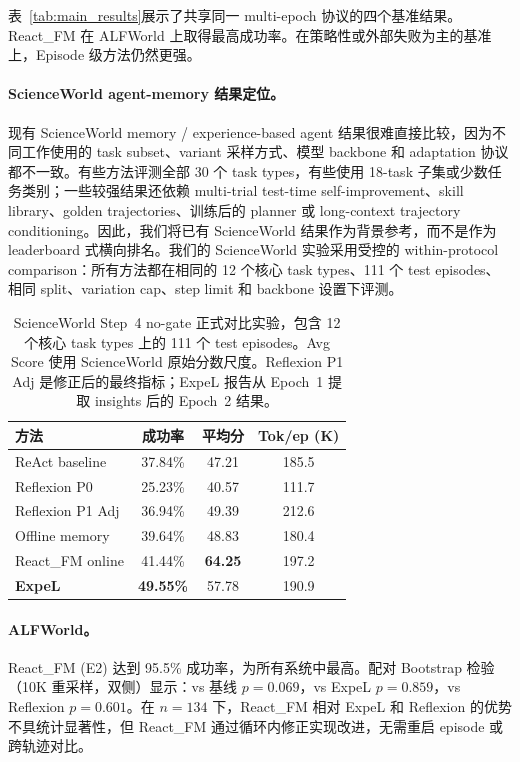 \documentclass[11pt,a4paper]{article}
\newcommand{\method}{React\_FM}
\begin{document}
表~\ref{tab:main_results}展示了共享同一 multi-epoch 协议的四个基准结果。\method{} 在 ALFWorld 上取得最高成功率。在策略性或外部失败为主的基准上，Episode 级方法仍然更强。

\paragraph{ScienceWorld agent-memory 结果定位。}
现有 ScienceWorld memory / experience-based agent 结果很难直接比较，因为不同工作使用的 task subset、variant 采样方式、模型 backbone 和 adaptation 协议都不一致。有些方法评测全部 30 个 task types，有些使用 18-task 子集或少数任务类别；一些较强结果还依赖 multi-trial test-time self-improvement、skill library、golden trajectories、训练后的 planner 或 long-context trajectory conditioning。因此，我们将已有 ScienceWorld 结果作为背景参考，而不是作为 leaderboard 式横向排名。我们的 ScienceWorld 实验采用受控的 within-protocol comparison：所有方法都在相同的 12 个核心 task types、111 个 test episodes、相同 split、variation cap、step limit 和 backbone 设置下评测。

\begin{table}[t]
\centering
\caption{ScienceWorld Step~4 no-gate 正式对比实验，包含 12 个核心 task types 上的 111 个 test episodes。Avg Score 使用 ScienceWorld 原始分数尺度。Reflexion P1 Adj 是修正后的最终指标；ExpeL 报告从 Epoch~1 提取 insights 后的 Epoch~2 结果。}
\label{tab:sw_step4}
\small
\setlength{\tabcolsep}{4pt}
\begin{tabular}{lccc}
\toprule
方法 & 成功率 & 平均分 & Tok/ep (K) \\
\midrule
ReAct baseline & 37.84\% & 47.21 & 185.5 \\
Reflexion P0 & 25.23\% & 40.57 & 111.7 \\
Reflexion P1 Adj & 36.94\% & 49.39 & 212.6 \\
Offline memory & 39.64\% & 48.83 & 180.4 \\
\method{} online & 41.44\% & \textbf{64.25} & 197.2 \\
\textbf{ExpeL} & \textbf{49.55\%} & 57.78 & 190.9 \\
\bottomrule
\end{tabular}
\end{table}

\paragraph{ALFWorld。} \method{} (E2) 达到 95.5\% 成功率，为所有系统中最高。配对 Bootstrap 检验（10K 重采样，双侧）显示：vs 基线 $p{=}0.069$，vs ExpeL $p{=}0.859$，vs Reflexion $p{=}0.601$。在 $n{=}134$ 下，\method{} 相对 ExpeL 和 Reflexion 的优势不具统计显著性，但 \method{} 通过循环内修正实现改进，无需重启 episode 或跨轨迹对比。
\end{document}
